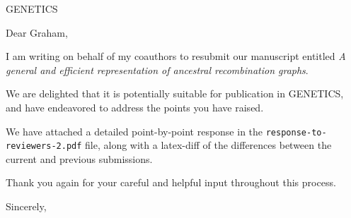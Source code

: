 \documentclass{letter}
\begin{document}
\begin{letter}{GENETICS}

\opening{Dear Graham,}

I am writing on behalf of my coauthors to resubmit our 
manuscript entitled
\emph{A general and efficient representation of ancestral recombination
graphs}. 

We are delighted that it is potentially suitable for publication in GENETICS,
and have endeavored to address the points you have raised.

We have attached a detailed point-by-point response in the 
\texttt{response-to-reviewers-2.pdf} file, along with a 
latex-diff of the differences between the current and previous submissions.

Thank you again for your careful and helpful input throughout this process.

\closing{Sincerely,}

\end{letter}
\end{document}
